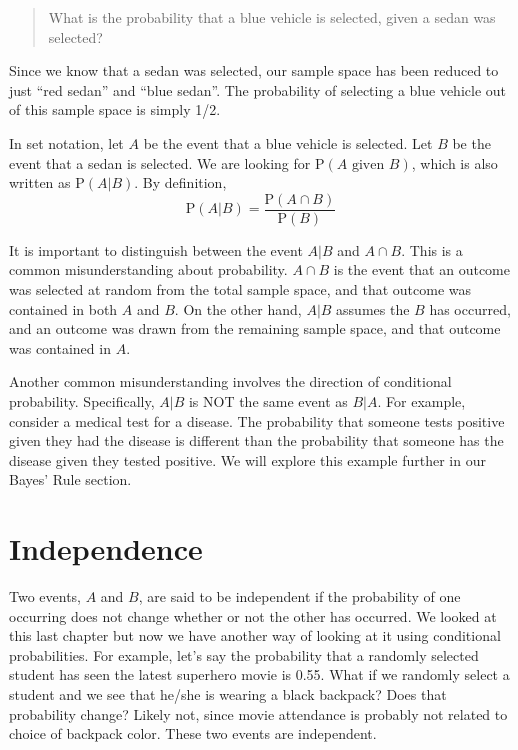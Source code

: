 \documentclass[
  letterpaper,
  DIV=11,
  numbers=noendperiod]{scrreprt}
\begin{document}
\begin{quote}
What is the probability that a blue vehicle is selected, given a sedan
was selected?
\end{quote}

Since we know that a sedan was selected, our sample space has been
reduced to just ``red sedan'' and ``blue sedan''. The probability of
selecting a blue vehicle out of this sample space is simply 1/2.

In set notation, let \(A\) be the event that a blue vehicle is selected.
Let \(B\) be the event that a sedan is selected. We are looking for
\(\mbox{P}(A \mbox{ given } B)\), which is also written as
\(\mbox{P}(A|B)\). By definition, \[
\mbox{P}(A|B)=\frac{\mbox{P}(A \cap B)}{\mbox{P}(B)}
\]

It is important to distinguish between the event \(A|B\) and
\(A \cap B\). This is a common misunderstanding about probability.
\(A \cap B\) is the event that an outcome was selected at random from
the total sample space, and that outcome was contained in both \(A\) and
\(B\). On the other hand, \(A|B\) assumes the \(B\) has occurred, and an
outcome was drawn from the remaining sample space, and that outcome was
contained in \(A\).

Another common misunderstanding involves the direction of conditional
probability. Specifically, \(A|B\) is NOT the same event as \(B|A\). For
example, consider a medical test for a disease. The probability that
someone tests positive given they had the disease is different than the
probability that someone has the disease given they tested positive. We
will explore this example further in our Bayes' Rule section.

\section{Independence}\label{independence}

Two events, \(A\) and \(B\), are said to be independent if the
probability of one occurring does not change whether or not the other
has occurred. We looked at this last chapter but now we have another way
of looking at it using conditional probabilities. For example, let's say
the probability that a randomly selected student has seen the latest
superhero movie is 0.55. What if we randomly select a student and we see
that he/she is wearing a black backpack? Does that probability change?
Likely not, since movie attendance is probably not related to choice of
backpack color. These two events are independent.
\end{document}
